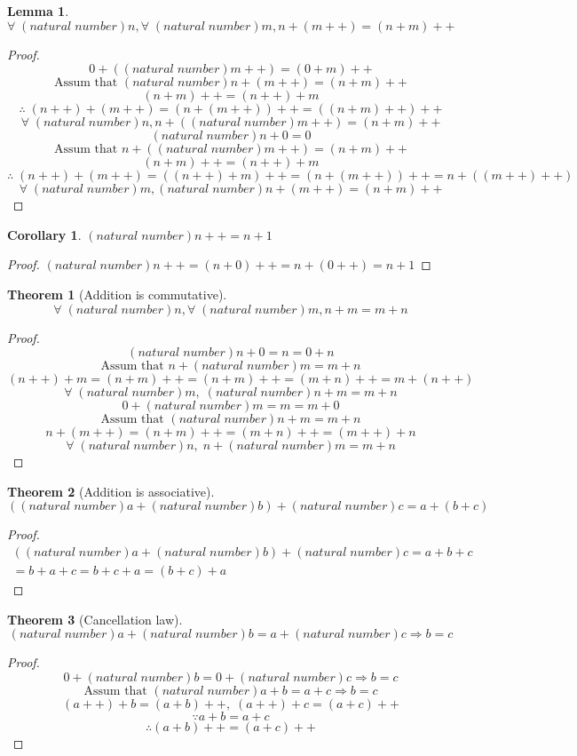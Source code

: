 \documentclass[a4paper]{report}
\theoremstyle{definition}
\newtheorem*{corollary}{Corollary}
\newtheorem{lemma}{Lemma}[subsubsection]
\newtheorem{theorem}{Theorem}[subsection]
\newcommand{\nn}{(natural\;number)}
\newcommand{\at}{\text{Assum that }}
\newcommand{\exforall}{\forall\;}
\begin{document}
\begin{lemma}
    $$\exforall\nn n,\exforall\nn m,n+(m++)=(n+m)++$$
\end{lemma}
\begin{proof}
    $$0+(\nn m++)=(0+m)++$$
    $$\at \nn n+(m++)=(n+m)++$$
    $$(n+m)++=(n++)+m$$
    $$\therefore\;(n++)+(m++)=(n+(m++))++=((n+m)++)++$$
    $$\exforall\nn n,n+(\nn m++)=(n+m)++$$
    $$$$
    $$\nn n+0=0$$
    $$\at n+(\nn m++)=(n+m)++$$
    $$(n+m)++=(n++)+m$$
    $$\therefore\;(n++)+(m++)=((n++)+m)++=(n+(m++))++=n+((m++)++)$$
    $$\exforall\nn m,\nn n+(m++)=(n+m)++$$
\end{proof}
\begin{corollary}
    $\nn n++=n+1$
\end{corollary}
\begin{proof}
    $\nn n++=(n+0)++=n+(0++)=n+1$
\end{proof}
\begin{theorem}[Addition is commutative]
    $$\exforall\nn n,\exforall\nn m,n+m=m+n$$
\end{theorem}
\begin{proof}
    $$\nn n+0=n=0+n$$
    $$\at n+\nn m=m+n$$
    $$(n++)+m=(n+m)++=(n+m)++=(m+n)++=m+(n++)$$
    $$\exforall\nn m,\;\nn n+m=m+n$$
    $$$$
    $$0+\nn m=m=m+0$$
    $$\at \nn n+m=m+n$$
    $$n+(m++)=(n+m)++=(m+n)++=(m++)+n$$
    $$\exforall\nn n,\;n+\nn m=m+n$$
\end{proof}
\begin{theorem}[Addition is associative]
    $$(\nn a+\nn b)+\nn c=a+(b+c)$$
\end{theorem}
\begin{proof}
    $$\begin{aligned}
        (\nn a+\nn b)+\nn c=a+b+c\\
        =b+a+c=b+c+a=(b+c)+a
    \end{aligned}$$
\end{proof}
\begin{theorem}[Cancellation law]
    $$\nn a+\nn b=a+\nn c\Rightarrow b=c$$
\end{theorem}
\begin{proof}
    $$0+\nn b=0+\nn c\Rightarrow b=c$$
    $$\at \nn a+b=a+c\Rightarrow b=c$$
    $$(a++)+b=(a+b)++,\;(a++)+c=(a+c)++$$
    $$\because a+b=a+c$$
    $$\therefore (a+b)++=(a+c)++$$
\end{proof}
\end{document}
